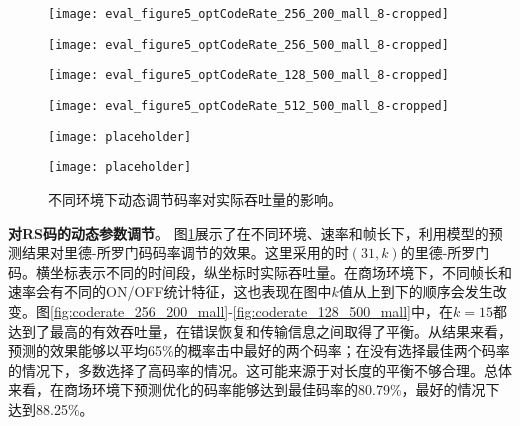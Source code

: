 \begin{figure}[t]
	\begin{minipage}[b]{.32\linewidth}
		\texttt{[image: eval\_figure5\_optCodeRate\_256\_200\_mall\_8-cropped]}
		\label{fig:coderate_256_200_mall}
	\end{minipage}
	\hfill
	\begin{minipage}[b]{.32\linewidth}
		\texttt{[image: eval\_figure5\_optCodeRate\_256\_500\_mall\_8-cropped]}
		\label{fig:coderate_256_500_mall}
	\end{minipage}
	\hfill
	\begin{minipage}[b]{.32\linewidth}
		\texttt{[image: eval\_figure5\_optCodeRate\_128\_500\_mall\_8-cropped]}
		\label{fig:coderate_128_500_mall}
	\end{minipage}

	\begin{minipage}[b]{.32\linewidth}
		\texttt{[image: eval\_figure5\_optCodeRate\_512\_500\_mall\_8-cropped]}
		\label{fig:coderate_512_500_mall}
	\end{minipage}
	\hfill
	\begin{minipage}[b]{.32\linewidth}
		\texttt{[image: placeholder]}
		\label{fig:coderate_256_200_lab}
	\end{minipage}
	\hfill
	\begin{minipage}[b]{.32\linewidth}
		\texttt{[image: placeholder]}
		\label{fig:coderate_256_200_home}
	\end{minipage}
	\caption{不同环境下动态调节码率对实际吞吐量的影响。}\label{fig:coderate}
\end{figure}
\textbf{对RS码的动态参数调节}。
图\ref{fig:coderate}展示了在不同环境、速率和帧长下，利用模型的预测结果对里德-所罗门码码率调节的效果。这里采用的时$(31, k)$的里德-所罗门码。横坐标表示不同的时间段，纵坐标时实际吞吐量。在商场环境下，不同帧长和速率会有不同的ON/OFF统计特征，这也表现在图中$k$值从上到下的顺序会发生改变。图\ref{fig:coderate_256_200_mall}-\ref{fig:coderate_128_500_mall}中，在$k = 15$都达到了最高的有效吞吐量，在错误恢复和传输信息之间取得了平衡。从结果来看，预测的效果能够以平均65\%的概率击中最好的两个码率；在没有选择最佳两个码率的情况下，多数选择了高码率的情况。这可能来源于对长度的平衡不够合理。总体来看，在商场环境下预测优化的码率能够达到最佳码率的80.79\%，最好的情况下达到88.25\%。

